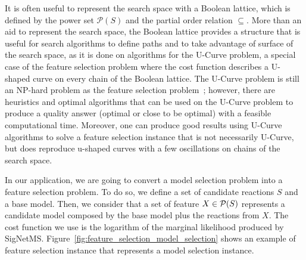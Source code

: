 It is often useful to represent the search space with a Boolean lattice, 
which is defined by the power set $\mathcal{P}(S)$ and the partial order 
relation $\subseteq$. More than an aid to represent the search space,
the Boolean lattice provides a structure that is useful for search
algorithms to define paths and to take advantage of surface of the 
search space, as it is done on algorithms for the U-Curve problem, a 
special case of the feature selection problem where the cost function 
describes a U-shaped curve on every chain of the Boolean lattice. The
U-Curve problem is still an NP-hard problem as the feature selection
problem~\cite{Rei12}; however, there are heuristics and optimal
algorithms that can be used on the U-Curve problem to produce a quality
answer (optimal or close to be optimal) with a feasible computational
time. Moreover, one can produce good results using U-Curve algorithms to 
solve a feature selection instance that is not necessarily U-Curve, but
does reproduce u-shaped curves with a few oscillations on chains of the
search space.

In our application, we are going to convert a model selection problem
into a feature selection problem. To do so, we define a set of candidate
reactions $S$ and a base model. Then, we consider that a set of feature
$X \in \mathcal{P} (S)$ represents a candidate model composed by the base
model plus the reactions from $X$. The cost function we use is the
logarithm of the marginal likelihood produced by SigNetMS.
Figure~\ref{fig:feature_selection_model_selection} shows an example of
feature selection instance that represents a model selection instance.


